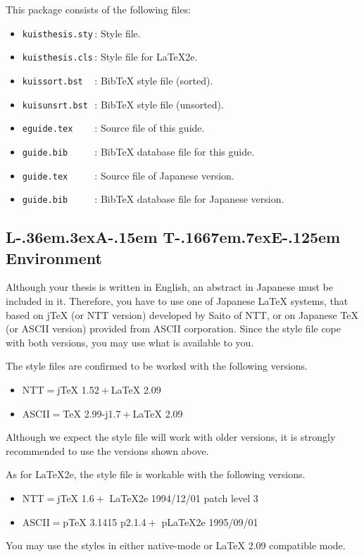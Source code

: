 \documentclass[master,english]{kuisthesis}
\def\LATex{\iLATEX\small}
\def\iLATEX#1{L\kern-.36em\raise.3ex\hbox{#1\bf A}\kern-.15em
    T\kern-.1667em\lower.7ex\hbox{E}\kern-.125em}
\def\LATEXe{\ifx\LaTeXe\undefined \LaTeX 2e\else\LaTeXe\fi}
\def\|{\verb|}
\begin{document}
This package consists of the following files:
\begin{itemize}%{
\item
\|kuisthesis.sty|\,:
Style file.
\item
\|kuisthesis.cls|\,:
Style file for \LATEXe.
\item
\|kuissort.bst  |\,:
Bib\TeX{} style file (sorted).
\item
\|kuisunsrt.bst |\,:
Bib\TeX{} style file (unsorted).
\item
\|eguide.tex    |\,:
Source file of this guide. 
\item
\|guide.bib     |\,:
Bib\TeX{} database file for this guide.
\item
\|guide.tex     |\,:
Source file of Japanese version.
\item
\|guide.bib     |\,:
Bib\TeX{} database file for Japanese version.
\end{itemize}%

\subsection[{\protect\LaTeX} Environment]{{\protect\LATex} Environment}
\label{appsub-env}
Although your thesis is written in English, an abstract in Japanese must be
included in it.  Therefore, you have to use one of Japanese {\LaTeX}
systems, that based on j{\TeX} (or NTT version) developed by Saito of NTT,
or on Japanese {\TeX} (or ASCII version) provided from ASCII corporation.
Since the style file cope with both versions, you may use what is available
to you.

The style files are confirmed to be worked with the following versions.
\begin{itemize}%
\item
NTT${}={}${j\TeX} 1.52${}+{}${\LaTeX} 2.09
\item 
ASCII${}={}${\TeX} 2.99-j1.7${}+{}${\LaTeX} 2.09
\end{itemize}%
Although we expect the style file will work with older versions, it is
strongly recommended to use the versions shown above.

As for {\LATEXe}, the style file is workable with the following versions.
\begin{itemize}%
\item
NTT${}={}${j\TeX} 1.6${}+{}$%
	{\LATEXe} 1994/12/01 patch level 3
\item 
ASCII${}={}${p\TeX} 3.1415 p2.1.4${}+{}$%
	{p\LATEXe} 1995/09/01
\end{itemize}%
You may use the styles in either native-mode or {\LaTeX} 2.09 compatible
mode.

\end{document}
